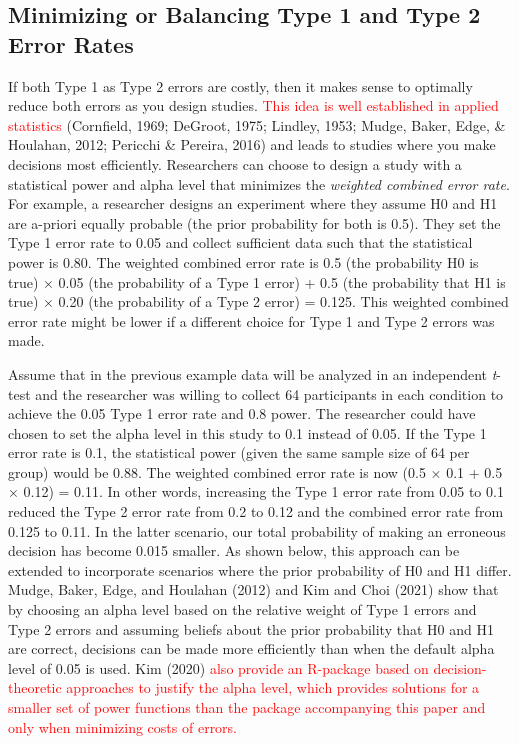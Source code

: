 \documentclass[
  english,
  ,man, a4paper,floatsintext]{apa6}
\begin{document}
\hypertarget{minimizing-or-balancing-type-1-and-type-2-error-rates}{%
\subsection{Minimizing or Balancing Type 1 and Type 2 Error Rates}\label{minimizing-or-balancing-type-1-and-type-2-error-rates}}

If both Type 1 as Type 2 errors are costly, then it makes sense to optimally reduce both errors as you design studies. \textcolor{red}{This idea is well established in applied statistics} (Cornfield, 1969; DeGroot, 1975; Lindley, 1953; Mudge, Baker, Edge, \& Houlahan, 2012; Pericchi \& Pereira, 2016) and leads to studies where you make decisions most efficiently. Researchers can choose to design a study with a statistical power and alpha level that minimizes the \emph{weighted combined error rate}. For example, a researcher designs an experiment where they assume H0 and H1 are a-priori equally probable (the prior probability for both is 0.5). They set the Type 1 error rate to 0.05 and collect sufficient data such that the statistical power is 0.80. The weighted combined error rate is 0.5 (the probability H0 is true) × 0.05 (the probability of a Type 1 error) + 0.5 (the probability that H1 is true) × 0.20 (the probability of a Type 2 error) = 0.125. This weighted combined error rate might be lower if a different choice for Type 1 and Type 2 errors was made.

Assume that in the previous example data will be analyzed in an independent \emph{t}-test and the researcher was willing to collect 64 participants in each condition to achieve the 0.05 Type 1 error rate and 0.8 power. The researcher could have chosen to set the alpha level in this study to 0.1 instead of 0.05. If the Type 1 error rate is 0.1, the statistical power (given the same sample size of 64 per group) would be 0.88. The weighted combined error rate is now (0.5 × 0.1 + 0.5 × 0.12) = 0.11. In other words, increasing the Type 1 error rate from 0.05 to 0.1 reduced the Type 2 error rate from 0.2 to 0.12 and the combined error rate from 0.125 to 0.11. In the latter scenario, our total probability of making an erroneous decision has become 0.015 smaller. As shown below, this approach can be extended to incorporate scenarios where the prior probability of H0 and H1 differ. Mudge, Baker, Edge, and Houlahan (2012) and Kim and Choi (2021) show that by choosing an alpha level based on the relative weight of Type 1 errors and Type 2 errors and assuming beliefs about the prior probability that H0 and H1 are correct, decisions can be made more efficiently than when the default alpha level of 0.05 is used. Kim (2020) \textcolor{red}{also provide an R-package based on decision-theoretic approaches to justify the alpha level, which provides solutions for a smaller set of power functions than the package accompanying this paper and only when minimizing costs of errors.}
\end{document}
